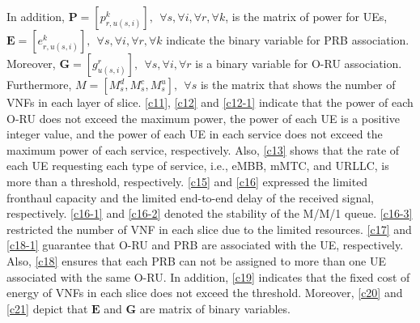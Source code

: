 \documentclass[lettersize,journal]{IEEEtran}
\begin{document}
In addition, $\boldsymbol{P} =[p_{r,u(s,i)}^{k}], \:\: \forall s , \forall i, \forall r, \forall k $, is the matrix of power for UEs, $\boldsymbol{E} =[e_{r,u(s,i)}^k], \:\: \forall s , \forall i, \forall r, \forall k$ indicate the binary variable for PRB association. Moreover, $\boldsymbol{G} =[g_{u(s,i)}^r], \:\: \forall s , \forall i, \forall r$ is a binary variable for O-RU association. Furthermore, $M = [M_s^d, M_s^c, M_s^u], \:\: \forall s$ is the matrix that shows the number of VNFs in each layer of slice.
\eqref{c11}, \eqref{c12} and \eqref{c12-1} indicate that the power of each O-RU does not exceed the maximum power, the power of each UE is a positive integer value, and the power of each UE in each service does not exceed the maximum power of each service, respectively.
Also, \eqref{c13} shows that the rate of each UE requesting each type of service, i.e., eMBB, mMTC, and URLLC, is more than a threshold, respectively.
\eqref{c15} and \eqref{c16} expressed the limited fronthaul capacity and the limited end-to-end delay of the received signal, respectively.
\eqref{c16-1} and \eqref{c16-2} denoted the stability of the M/M/1 queue.
\eqref{c16-3} restricted the number of VNF in each slice due to the limited resources.
\eqref{c17} and \eqref{c18-1} guarantee that O-RU and PRB are associated with the UE, respectively.
Also, \eqref{c18} ensures that each PRB can not be assigned to more than one UE associated with the same O-RU.
In addition, \eqref{c19} indicates that the fixed cost of energy of VNFs in each slice does not exceed the threshold.
Moreover, \eqref{c20} and \eqref{c21} depict that $\boldsymbol{E}$ and $\boldsymbol{G}$ are matrix of binary variables.
\end{document}
